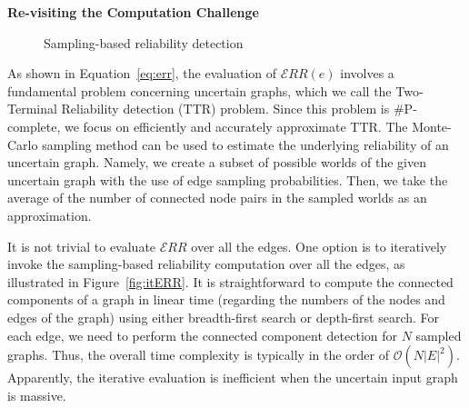 \textbf{Re-visiting the Computation Challenge}~~
\begin{figure}
    \caption{Sampling-based reliability detection}
    \label{fig:computationERR}
\end{figure} 
As shown in Equation~\ref{eq:err},  
the evaluation of $\mathcal{E}RR(e)$ involves a fundamental problem concerning uncertain graphs, which we call 
the Two-Terminal Reliability detection (TTR) problem. 
Since this problem is \#P-complete, we focus on efficiently and accurately approximate TTR.
The Monte-Carlo sampling method can be used to estimate the underlying reliability of an uncertain graph. 
Namely, we create a subset of possible worlds of the given uncertain graph with the use of edge sampling probabilities. 
Then, we take the average of the number of connected node pairs in the sampled worlds as an approximation. 
 
It is not trivial to evaluate $\mathcal{E}RR$ over all the edges. 
One option is to iteratively invoke the sampling-based reliability computation over all the edges, 
as illustrated in Figure~\ref{fig:itERR}. 
It is straightforward to compute the connected components of a graph in linear time (regarding the numbers of the nodes and edges of the graph) using either breadth-first search or depth-first search.
For each edge, we need to perform the connected component detection for $N$ sampled graphs.
Thus, the overall time complexity is typically in the order of $\mathcal{O}( N |E|^{2})$.
Apparently, the iterative evaluation is inefficient when the uncertain input graph is massive.

